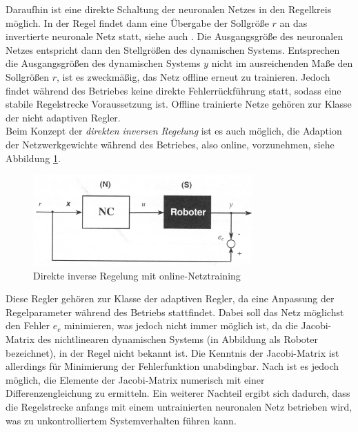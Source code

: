 Daraufhin ist eine direkte Schaltung der neuronalen Netzes in den Regelkreis möglich.  In der Regel findet dann eine Übergabe der Sollgröße $r$ an das invertierte neuronale Netz statt, siehe auch \cite{Almusawi.2016}. Die Ausgangsgröße des neuronalen Netzes entspricht dann den Stellgrößen des dynamischen Systems.  Entsprechen die Ausgangsgrößen des dynamischen Systems $y$ nicht im ausreichenden Maße den Sollgrößen $r$, ist es zweckmäßig, das Netz offline erneut zu trainieren. Jedoch findet während des Betriebes keine direkte Fehlerrückführung statt, sodass eine stabile Regelstrecke Voraussetzung ist. Offline trainierte Netze gehören zur Klasse der nicht adaptiven Regler.   \\
Beim Konzept der \textit{direkten inversen Regelung} ist es auch möglich, die Adaption der Netzwerkgewichte während des Betriebes, also online, vorzunehmen, siehe Abbildung \ref{fig:direct_inverse_online}. 

\begin{figure} [h]
	\centering
	\includegraphics[width=0.75\textwidth]{images/direct_inverse_control_online}
	\caption{Direkte inverse Regelung mit online-Netztraining \cite{Sklyarenko.2002}}
	\label{fig:direct_inverse_online}
\end{figure}

Diese Regler gehören zur Klasse der adaptiven Regler, da eine Anpassung der Regelparameter während des Betriebs stattfindet. Dabei soll das Netz möglichst den Fehler $e_c$ minimieren, was jedoch nicht immer möglich ist, da die Jacobi-Matrix des nichtlinearen dynamischen Systems (in Abbildung als Roboter bezeichnet), in der Regel nicht bekannt ist. Die Kenntnis der Jacobi-Matrix ist allerdings für Minimierung der Fehlerfunktion unabdingbar. Nach \cite{Sklyarenko.2002} ist es jedoch möglich, die Elemente der Jacobi-Matrix numerisch mit einer Differenzengleichung zu ermitteln. Ein weiterer Nachteil ergibt sich dadurch, dass die Regelstrecke anfangs mit einem untrainierten neuronalen Netz betrieben wird, was zu unkontrolliertem Systemverhalten führen kann. \\

